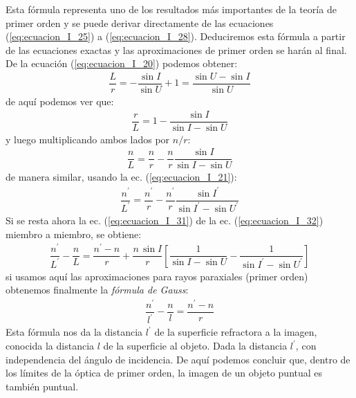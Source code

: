 \documentclass[14pt]{extarticle}
\begin{document}
Esta fórmula representa uno de los resultados más importantes de la teoría de primer orden y se puede derivar directamente de las ecuaciones (\ref{eq:ecuacion_I_25}) a (\ref{eq:ecuacion_I_28}). Deduciremos esta fórmula a partir de las ecuaciones exactas y las aproximaciones de primer orden se harán al final. De la ecuación (\ref{eq:ecuacion_I_20}) podemos obtener:
\begin{align}
\dfrac{L}{r} = - \dfrac{\sin I}{\sin U} + 1 = \dfrac{\sin U - \sin I}{\sin U}
\label{eq:ecuacion_I_29}
\end{align}
de aquí podemos ver que:
\begin{align}
\dfrac{r}{L} = 1 - \dfrac{\sin I}{\sin I - \sin U}
\label{eq:ecuacion_I_30}
\end{align}
y luego multiplicando ambos lados por $n/r$:
\begin{align}
\dfrac{n}{L} = \dfrac{n}{r} - \dfrac{n}{r} \dfrac{\sin I}{\sin I - \sin U}
\label{eq:ecuacion_I_31}
\end{align}
de manera similar, usando la ec. (\ref{eq:ecuacion_I_21}):
\begin{align}
\dfrac{n^{\prime}}{L^{\prime}} = \dfrac{n^{\prime}}{r} - \dfrac{n^{\prime}}{r} \dfrac{\sin I^{\prime}}{\sin I^{\prime} - \sin U^{\prime}}
\label{eq:ecuacion_I_32}
\end{align}
Si se resta ahora la ec. (\ref{eq:ecuacion_I_31}) de la ec. (\ref{eq:ecuacion_I_32}) miembro a miembro, se obtiene:
\begin{align}
\dfrac{n^{\prime}}{L^{\prime}} - \dfrac{n}{L} = \dfrac{n^{\prime} - n}{r} + \dfrac{n \, \sin I}{r} \left[ \dfrac{1}{\sin I - \sin U} - \dfrac{1}{\sin I^{\prime} - \sin U^{\prime}} \right]
\label{eq:ecuacion_I_33}
\end{align}
si usamos aquí las aproximaciones para rayos paraxiales (primer orden) obtenemos finalmente la \textit{fórmula de Gauss}:
\begin{align}
\dfrac{n^{\prime}}{l^{\prime}} - \dfrac{n}{l} = \dfrac{n^{\prime} - n}{r}
\label{eq:ecuacion_I_34}
\end{align}
Esta fórmula nos da la distancia $l^{\prime}$ de la superficie refractora a la imagen, conocida la distancia $l$ de la superficie al objeto. Dada la distancia $l^{\prime}$, con independencia del ángulo de incidencia. De aquí podemos concluir que, dentro de los límites de la óptica de primer orden, la imagen de un objeto puntual es también puntual.
\end{document}
